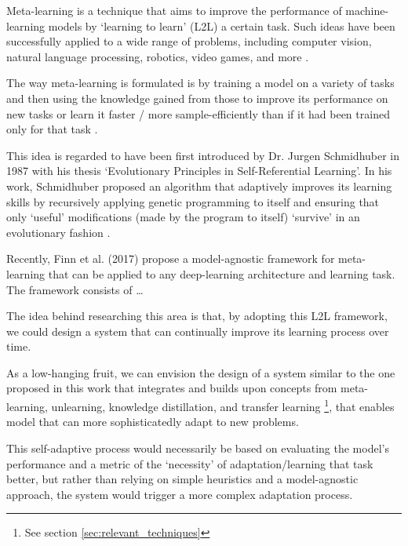 \documentclass[../main.tex]{subfiles}
\begin{document}
    Meta-learning is a technique that aims to improve the performance of machine-learning models by `learning to learn' (L2L) a certain task. Such ideas have been successfully applied to a wide range of problems, including computer vision, natural language processing, robotics, video games, and more \cite{hospedales_meta-learning_2020}.
    
    The way meta-learning is formulated is by training a model on a variety of tasks and then using the knowledge gained from those to improve its performance on new tasks or learn it faster / more sample-efficiently than if it had been trained only for that task \cite{hospedales_meta-learning_2020}.
    
    This idea is regarded to have been first introduced by Dr. Jurgen Schmidhuber in 1987 with his thesis `Evolutionary Principles in Self-Referential Learning'. In his work, Schmidhuber proposed an algorithm that adaptively improves its learning skills by recursively applying genetic programming to itself and ensuring that only `useful' modifications (made by the program to itself) `survive' in an evolutionary fashion \cite{schmidhuber_evolutionary_1987}.
    
    Recently, Finn et al. (2017) \cite{finn_model-agnostic_2017} propose a model-agnostic framework for meta-learning that can be applied to any deep-learning architecture and learning task. The framework consists of \dots

    The idea behind researching this area is that, by adopting this L2L framework, we could design a system that can continually improve its learning process over time.

    As a low-hanging fruit, we can envision the design of a system similar to the one proposed in this work that integrates and builds upon concepts from meta-learning, unlearning, knowledge distillation, and transfer learning \footnote{See section \ref{sec:relevant_techniques}}, that enables model that can more sophisticatedly adapt to new problems. 
    
    This self-adaptive process would necessarily be based on evaluating the model's performance and a metric of the `necessity' of adaptation/learning that task better, but rather than relying on simple heuristics and a model-agnostic approach, the system would trigger a more complex adaptation process.

    \clearpage
  
\end{document}
